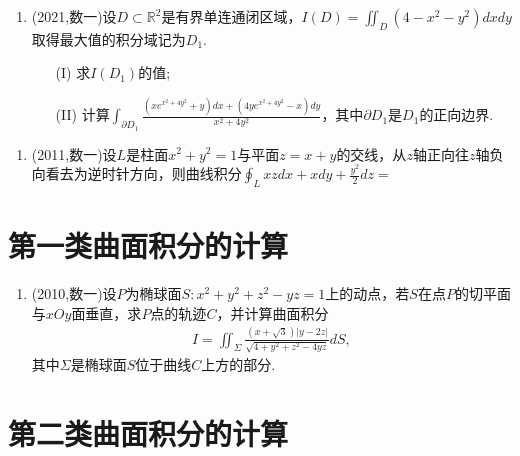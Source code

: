 \documentclass[12pt, a4paper, oneside, UTF8]{ctexbook}
\begin{document}
\begin{enumerate}[label=\arabic*.,start=5]
    \item (2021,数一)设$D\subset \mathbb{R}^2$是有界单连通闭区域，$I(D)=\iint_D(4-x^2-y^2)dxdy$取得最大值的积分域记为$D_1$.
    \begin{enumerate}
        \item[(I)] 求$I(D_1)$的值;
        \item[(II)] 计算$\int_{\partial D_1}\frac{(xe^{x^2+4y^2}+y)dx+(4ye^{x^2+4y^2}-x)dy}{x^2+4y^2}$，其中$\partial D_1$是$D_1$的正向边界.
    \end{enumerate}
    
    \begin{solution}
    \newpage
    \end{solution}
\end{enumerate}

\begin{enumerate}[label=\arabic*.,start=6]
    \item (2011,数一)设$L$是柱面$x^2+y^2=1$与平面$z=x+y$的交线，从$z$轴正向往$z$轴负向看去为逆时针方向，则曲线积分$\oint_L xz dx+xdy+\frac{y^2}{2}dz=$
    
    \begin{solution}
    \newpage
    \end{solution}
\end{enumerate}

\section{第一类曲面积分的计算}

\begin{enumerate}[label=\arabic*.,start=7]
    \item (2010,数一)设$P$为椭球面$S:x^2+y^2+z^2-yz=1$上的动点，若$S$在点$P$的切平面与$xOy$面垂直，求$P$点的轨迹$C$，并计算曲面积分
    \begin{align*}
    I=\iint_{\Sigma}\frac{(x+\sqrt{3})|y-2z|}{\sqrt{4+y^2+z^2-4yz}}dS,
    \end{align*}
    其中$\Sigma$是椭球面$S$位于曲线$C$上方的部分.
    
    \begin{solution}
    \newpage
    \end{solution}
\end{enumerate}

\section{第二类曲面积分的计算}
\end{document}
